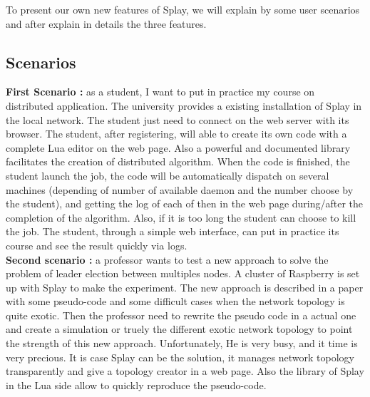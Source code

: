 \documentclass{eplmastersthesis}
\begin{document}
     To present our own new features of Splay, we will explain by some user scenarios and after explain in details the three features.

      \subsection{Scenarios}

        \textbf{First Scenario : } as a student, I want to put in practice my course on distributed application. The university provides a existing installation of Splay in the local network. The student just need to connect on the web server with its browser. The student, after registering, will able to create its own code with a complete Lua editor on the web page. Also a powerful and documented library facilitates the creation of distributed algorithm. When the code is finished, the student launch the job, the code will be automatically dispatch on several machines (depending of number of available daemon and the number choose by the student), and getting the log of each of then in the web page during/after the completion of the algorithm. Also, if it is too long the student can choose to kill the job. The student, through a simple web interface, can put in practice its course and see the result quickly via logs.\\
    
    	\textbf{Second scenario : } a professor wants to test a new approach to solve the problem of leader election between multiples nodes. A cluster of Raspberry is set up with Splay to make the experiment. The new approach is described in a paper with some pseudo-code and some difficult cases when the network topology is quite exotic. Then the professor need to rewrite the pseudo code in a actual one and create a simulation or truely the different exotic network topology to point the strength of this new approach. Unfortunately, He is very busy, and it time is very precious. It is case Splay can be the solution, it manages network topology transparently and give a topology creator in a web page. Also the library of Splay in the Lua side allow to quickly reproduce the pseudo-code. 
        
    
        
\end{document}
